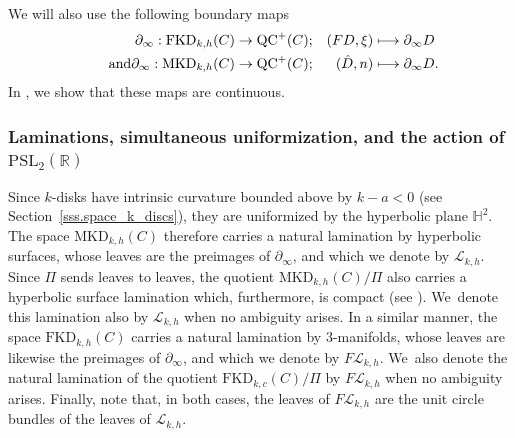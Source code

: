 \documentclass[10pt]{amsart}
\newcommand\mto{\mathchoice{\longmapsto}{\mapsto}{\mapsto}{\mapsto}}
\newcommand{\kdisks}{$k$\nobreakdash-disks\xspace}
\theoremstyle{plain}
\theoremstyle{definition}
\newcommand\PSL{\mathrm{PSL}_2(\mathbb{R})}
\newcommand\Hd{\mathbb{H}^2}
\newcommand{\cL}{{\mathcal L}}
\newcommand{\QC}{\mathrm{QC}}
\newcommand{\MKD}{\mathrm{MKD}}
\newcommand{\FKD}{\mathrm{FKD}}
\newcommand{\bord}{\partial_{\infty}}
\begin{document}
We will also use the following boundary maps
\begin{align*}
\bord:\FKD_{k,h}(C)&\to\QC^+(C);&(FD,\xi)&\mto\bord D\\
\tag*{and}\bord:\MKD_{k,h}(C)&\to\QC^+(C);&(\hat{D},n)&\mto\bord D.
\end{align*}
In \cite{ALS}, we show that these maps are continuous.

\subsubsection{Laminations, simultaneous uniformization, and the action of $\PSL$}
\label{sssec:LaminationsSimultaneousUniformization}
Since \kdisks have intrinsic curvature bounded above by $k-a<0$ (see Section~\ref{sss.space_k_discs}), they are uniformized by the hyperbolic plane $\Hd$. The space $\MKD_{k,h}(C)$ therefore carries a natural lamination by hyperbolic surfaces, whose leaves are the preimages of $\bord$, and which we denote by $\cL_{k,h}$. Since $\Pi$ sends leaves to leaves, the quotient $\MKD_{k,h}(C)/\Pi$ also carries a hyperbolic surface lamination which, furthermore, is compact (see \cite{LabourieGAFA}). We~denote this lamination also by $\cL_{k,h}$ when no ambiguity arises. In a similar manner, the space $\FKD_{k,h}(C)$ carries a natural lamination by $3$\nobreakdash-manifolds, whose leaves are likewise the preimages of $\bord$, and which we denote by $F\cL_{k,h}$. We~also denote the natural lamination of the quotient $\FKD_{k,c}(C)/\Pi$ by $F\cL_{k,h}$ when no ambiguity arises. Finally, note that, in both cases, the leaves of $F\cL_{k,h}$ are the unit circle bundles of the leaves of $\cL_{k,h}$.
\end{document}
